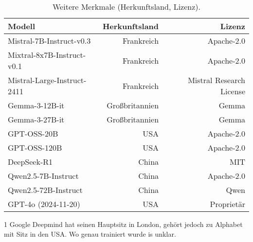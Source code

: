 \begin{table}[htbp]
    \centering
    \begin{threeparttable}
    \caption{Weitere Merkmale (Herkunftsland, Lizenz).}
    \label{tab:models-other}
    \begin{tabular}{l r r}
        \toprule
        \textbf{Modell} & \textbf{Herkunftsland} & \textbf{Lizenz} \\
        \midrule
        Mistral-7B-Instruct-v0.3 & Frankreich & Apache-2.0 \cite{HF_Mistral7B_2025} \\
        Mixtral-8x7B-Instruct-v0.1 & Frankreich & Apache-2.0 \cite{HF_Mixtral8x7B_2025} \\
        Mistral-Large-Instruct-2411 & Frankreich & Mistral Research License \cite{HF_MistralLargeInstruct_2025, MRL_Research_License} \\
        \midrule
        Gemma-3-12B-it & Großbritannien\tnote{1} & Gemma \cite{HF_Gemma3_12B_2025, Gemma3_License} \\
        Gemma-3-27B-it & Großbritannien & Gemma \cite{HF_Gemma3_27B_2025, Gemma3_License} \\
        \midrule
        GPT-OSS-20B & USA & Apache-2.0 \cite{OpenAI_GPTOSS_ModelCard_2025} \\
        GPT-OSS-120B & USA & Apache-2.0 \cite{OpenAI_GPTOSS_ModelCard_2025} \\
        \midrule
        DeepSeek-R1 & China & MIT \cite{HF_DeepSeekR1_2025} \\
        \midrule
        Qwen2.5-7B-Instruct & China & Apache-2.0 \cite{HF_Qwen7B_2025} \\
        Qwen2.5-72B-Instruct & China & Qwen \cite{HF_Qwen72B_2025, Qwen72B_License_blame} \\
        \midrule
        GPT-4o (2024-11-20) & USA & Proprietär \cite{openai-hello-gpt-4o} \\
        \bottomrule
    \end{tabular}
    \begin{tablenotes}
        \item[1] Google Deepmind hat seinen Hauptsitz in London, gehört jedoch zu Alphabet mit Sitz in den USA. Wo genau trainiert wurde is unklar.
    \end{tablenotes}
    \end{threeparttable}
\end{table}

